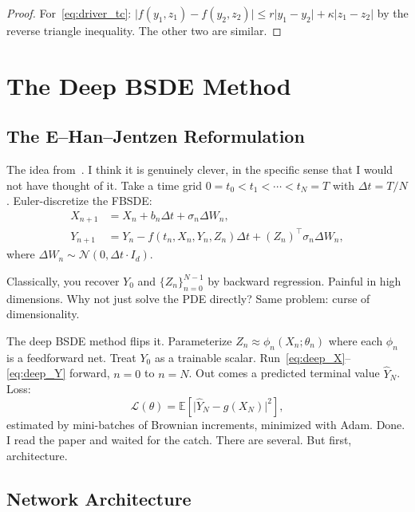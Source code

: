 \documentclass[11pt]{article}
\theoremstyle{definition}
\theoremstyle{remark}
\newcommand{\E}{\mathbb{E}}
\newcommand{\abs}[1]{\lvert #1 \rvert}
\begin{document}
\begin{proof}
For~\eqref{eq:driver_tc}: $\abs{f(y_1,z_1) - f(y_2,z_2)}
\le r\abs{y_1-y_2} + \kappa\abs{z_1-z_2}$ by the reverse triangle inequality.
The other two are similar.
\end{proof}


\section{The Deep BSDE Method}\label{sec:deep_bsde}

\subsection{The E--Han--Jentzen Reformulation}

The idea from~\cite{ehan2017deep,han2018solving}. I think it is
genuinely clever, in the specific sense that I would not have thought
of it. Take a time grid
$0 = t_0 < t_1 < \cdots < t_N = T$ with $\Delta t = T/N$.
Euler-discretize the FBSDE:
\begin{align}
  X_{n+1} &= X_n + b_n \Delta t + \sigma_n \Delta W_n, \label{eq:deep_X}\\
  Y_{n+1} &= Y_n - f(t_n, X_n, Y_n, Z_n)\Delta t
             + (Z_n)^\top \sigma_n \Delta W_n, \label{eq:deep_Y}
\end{align}
where $\Delta W_n \sim \mathcal{N}(0, \Delta t \cdot I_d)$.

Classically, you recover $Y_0$ and $\{Z_n\}_{n=0}^{N-1}$ by backward
regression. Painful in high dimensions. Why not just solve the PDE
directly? Same problem: curse of dimensionality.

The deep BSDE method flips it.
Parameterize $Z_n \approx \phi_n(X_n; \theta_n)$ where each
$\phi_n$ is a feedforward net.
Treat $Y_0$ as a trainable scalar.
Run~\eqref{eq:deep_X}--\eqref{eq:deep_Y} forward, $n=0$ to $n=N$.
Out comes a predicted terminal value $\hat{Y}_N$. Loss:
\begin{equation}\label{eq:deep_loss}
  \mathcal{L}(\theta) = \E\!\left[\abs{\hat{Y}_N - g(X_N)}^2\right],
\end{equation}
estimated by mini-batches of Brownian increments, minimized with Adam.
Done. I read the paper and waited for the catch.
There are several. But first, architecture.

\subsection{Network Architecture}
\end{document}
